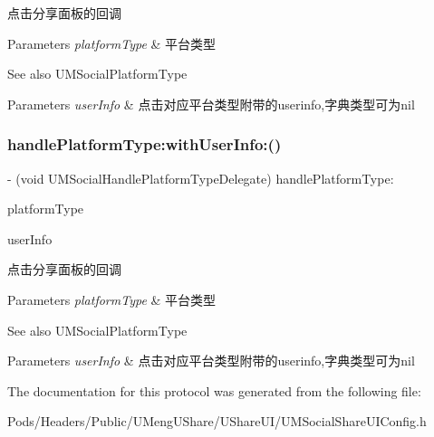 点击分享面板的回调


\begin{DoxyParams}{Parameters}
{\em platform\+Type} & 平台类型 \\
\hline
\end{DoxyParams}
\begin{DoxySeeAlso}{See also}
U\+M\+Social\+Platform\+Type 
\end{DoxySeeAlso}

\begin{DoxyParams}{Parameters}
{\em user\+Info} & 点击对应平台类型附带的userinfo,字典类型可为nil \\
\hline
\end{DoxyParams}
\mbox{\label{protocol_u_m_social_handle_platform_type_delegate_01-p_a204492c5bca7a7799de17ed3bab26c5c}} 
\subsubsection{\texorpdfstring{handle\+Platform\+Type\+:with\+User\+Info\+:()}{handlePlatformType:withUserInfo:()}\hspace{0.1cm}{\footnotesize\ttfamily [2/2]}}
{\footnotesize\ttfamily -\/ (void U\+M\+Social\+Handle\+Platform\+Type\+Delegate) handle\+Platform\+Type\+: \begin{DoxyParamCaption}\item[{(U\+M\+Social\+Platform\+Type)}]{platform\+Type }\item[{withUserInfo:(N\+S\+Dictionary $\ast$)}]{user\+Info }\end{DoxyParamCaption}\hspace{0.3cm}{\ttfamily [optional]}}

点击分享面板的回调


\begin{DoxyParams}{Parameters}
{\em platform\+Type} & 平台类型 \\
\hline
\end{DoxyParams}
\begin{DoxySeeAlso}{See also}
U\+M\+Social\+Platform\+Type 
\end{DoxySeeAlso}

\begin{DoxyParams}{Parameters}
{\em user\+Info} & 点击对应平台类型附带的userinfo,字典类型可为nil \\
\hline
\end{DoxyParams}


The documentation for this protocol was generated from the following file\+:\begin{DoxyCompactItemize}
\item 
Pods/\+Headers/\+Public/\+U\+Meng\+U\+Share/\+U\+Share\+U\+I/U\+M\+Social\+Share\+U\+I\+Config.\+h\end{DoxyCompactItemize}
